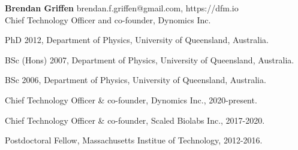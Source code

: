 \documentclass[12pt,letterpaper]{article}
\begin{document}
\thispagestyle{empty}\sloppy\sloppypar\raggedbottom

\textbf{\Large Brendan Griffen} \hfill
\textsf{\small brendan.f.griffen@gmail.com, https://dfm.io} \\[0.5ex]
Chief Technology Officer and co-founder, Dynomics Inc.\\[0.5ex]

\begin{list}{}{\cvlist}
  \item
        PhD 2012,  Department of Physics, University of Queensland, Australia.
  \item
        BSc (Hons) 2007, Department of Physics, University of Queensland, Australia.
  \item
        BSc 2006, Department of Physics, University of Queensland, Australia.
\end{list}


\begin{list}{}{\cvlist}
  \item
        Chief Technology Officer & co-founder, Dynomics Inc., 2020-present.
  \item
        Chief Technology Officer & co-founder, Scaled Biolabs Inc., 2017-2020.
  \item
        Postdoctoral Fellow, Massachusetts Institue of Technology, 2012-2016.
\end{list}


\ifdefined\withpubs
  

  \begin{list}{}{\cvlist}
    
  \end{list}

  \begin{list}{}{\cvlist}
    
  \end{list}
\fi
\end{document}
